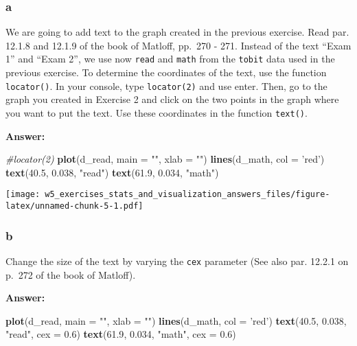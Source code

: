 \documentclass[]{article}
\newenvironment{Shaded}{\begin{snugshade}}{\end{snugshade}}
\newcommand{\CommentTok}[1]{\textcolor[rgb]{0.56,0.35,0.01}{\textit{#1}}}
\newcommand{\DataTypeTok}[1]{\textcolor[rgb]{0.13,0.29,0.53}{#1}}
\newcommand{\FloatTok}[1]{\textcolor[rgb]{0.00,0.00,0.81}{#1}}
\newcommand{\KeywordTok}[1]{\textcolor[rgb]{0.13,0.29,0.53}{\textbf{#1}}}
\newcommand{\NormalTok}[1]{#1}
\newcommand{\StringTok}[1]{\textcolor[rgb]{0.31,0.60,0.02}{#1}}
\begin{document}
\hypertarget{a-1}{%
\subsubsection{a}\label{a-1}}

We are going to add text to the graph created in the previous exercise.
Read par. 12.1.8 and 12.1.9 of the book of Matloff, pp.~270 - 271.
Instead of the text ``Exam 1'' and ``Exam 2'', we use now \texttt{read}
and \texttt{math} from the \texttt{tobit} data used in the previous
exercise. To determine the coordinates of the text, use the function
\texttt{locator()}. In your console, type \texttt{locator(2)} and use
enter. Then, go to the graph you created in Exercise 2 and click on the
two points in the graph where you want to put the text. Use these
coordinates in the function \texttt{text()}.

\textbf{Answer:}

\begin{Shaded}
\begin{Highlighting}[]
\CommentTok{#locator(2)}
\KeywordTok{plot}\NormalTok{(d_read, }\DataTypeTok{main =} \StringTok{""}\NormalTok{, }\DataTypeTok{xlab =} \StringTok{""}\NormalTok{)}
\KeywordTok{lines}\NormalTok{(d_math, }\DataTypeTok{col =} \StringTok{'red'}\NormalTok{)}
\KeywordTok{text}\NormalTok{(}\FloatTok{40.5}\NormalTok{,  }\FloatTok{0.038}\NormalTok{, }\StringTok{"read"}\NormalTok{)}
\KeywordTok{text}\NormalTok{(}\FloatTok{61.9}\NormalTok{, }\FloatTok{0.034}\NormalTok{, }\StringTok{"math"}\NormalTok{)}
\end{Highlighting}
\end{Shaded}

\texttt{[image: w5\_exercises\_stats\_and\_visualization\_answers\_files/figure-latex/unnamed-chunk-5-1.pdf]}

\hypertarget{b-1}{%
\subsubsection{b}\label{b-1}}

Change the size of the text by varying the \texttt{cex} parameter (See
also par. 12.2.1 on p.~272 of the book of Matloff).

\textbf{Answer:}

\begin{Shaded}
\begin{Highlighting}[]
\KeywordTok{plot}\NormalTok{(d_read, }\DataTypeTok{main =} \StringTok{""}\NormalTok{, }\DataTypeTok{xlab =} \StringTok{""}\NormalTok{)}
\KeywordTok{lines}\NormalTok{(d_math, }\DataTypeTok{col =} \StringTok{'red'}\NormalTok{)}
\KeywordTok{text}\NormalTok{(}\FloatTok{40.5}\NormalTok{,  }\FloatTok{0.038}\NormalTok{, }\StringTok{"read"}\NormalTok{, }\DataTypeTok{cex =} \FloatTok{0.6}\NormalTok{)}
\KeywordTok{text}\NormalTok{(}\FloatTok{61.9}\NormalTok{, }\FloatTok{0.034}\NormalTok{, }\StringTok{"math"}\NormalTok{, }\DataTypeTok{cex =} \FloatTok{0.6}\NormalTok{)}
\end{Highlighting}
\end{Shaded}
\end{document}
